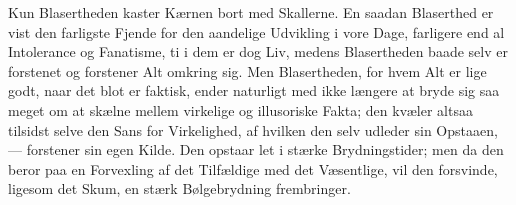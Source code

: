 \documentclass[12pt,a4paper]{article}
\begin{document}
Kun Blasertheden kaster Kærnen bort med Skallerne. En saadan Blaserthed
er vist den farligste Fjende for den aandelige Udvikling i vore Dage,
farligere end al Intolerance og Fanatisme, ti i dem er dog Liv, medens
Blasertheden baade selv er forstenet og forstener Alt omkring sig. Men
Blasertheden, for hvem Alt er lige godt, naar det blot er faktisk,
ender naturligt med ikke længere at bryde sig saa meget om at skælne
mellem virkelige og illusoriske Fakta; den kvæler altsaa tilsidst selve
den Sans for Virkelighed, af hvilken den selv udleder sin Opstaaen, ---
forstener sin egen Kilde. Den opstaar let i stærke Brydningstider; men
da den beror paa en Forvexling af det Tilfældige med det Væsentlige,
vil den forsvinde, ligesom det Skum, en stærk Bølgebrydning frembringer.
\end{document}

